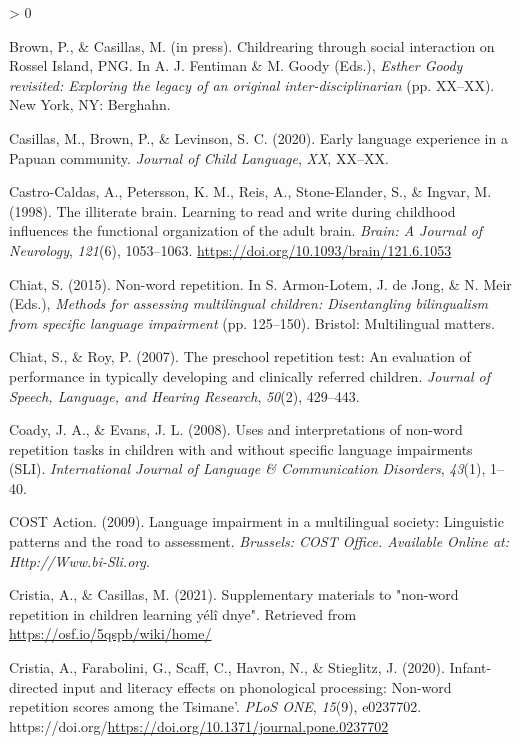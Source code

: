 \documentclass[
  english,
  ,man,floatsintext]{apa6}
\newlength{\cslhangindent}
\newenvironment{CSLReferences}[2] %
 {%
  \setlength{\parindent}{0pt}
  \ifodd #1 \everypar{\setlength{\hangindent}{\cslhangindent}}\ignorespaces\fi
  \ifnum #2 > 0
  \setlength{\parskip}{#2\baselineskip}
  \fi
 }%
 {}
\begin{document}
\begin{CSLReferences}{1}{0}
\leavevmode\hypertarget{ref-brownIPchildrearing}{}%
Brown, P., \& Casillas, M. (in press). Childrearing through social interaction on {Rossel Island, PNG}. In A. J. Fentiman \& M. Goody (Eds.), \emph{{Esther Goody} revisited: Exploring the legacy of an original inter-disciplinarian} (pp. XX--XX). New York, NY: Berghahn.

\leavevmode\hypertarget{ref-casillas2020early}{}%
Casillas, M., Brown, P., \& Levinson, S. C. (2020). {Early language experience in a Papuan community}. \emph{Journal of Child Language}, \emph{XX}, XX--XX.

\leavevmode\hypertarget{ref-castro1998illiterate}{}%
Castro-Caldas, A., Petersson, K. M., Reis, A., Stone-Elander, S., \& Ingvar, M. (1998). {The illiterate brain. Learning to read and write during childhood influences the functional organization of the adult brain.} \emph{Brain: A Journal of Neurology}, \emph{121}(6), 1053--1063. \url{https://doi.org/10.1093/brain/121.6.1053}

\leavevmode\hypertarget{ref-chiat2015nonword}{}%
Chiat, S. (2015). Non-word repetition. In S. Armon-Lotem, J. de Jong, \& N. Meir (Eds.), \emph{Methods for assessing multilingual children: Disentangling bilingualism from specific language impairment} (pp. 125--150). Bristol: Multilingual matters.

\leavevmode\hypertarget{ref-chiat2007preschool}{}%
Chiat, S., \& Roy, P. (2007). The preschool repetition test: An evaluation of performance in typically developing and clinically referred children. \emph{Journal of Speech, Language, and Hearing Research}, \emph{50}(2), 429--443.

\leavevmode\hypertarget{ref-coady2008uses}{}%
Coady, J. A., \& Evans, J. L. (2008). Uses and interpretations of non-word repetition tasks in children with and without specific language impairments (SLI). \emph{International Journal of Language \& Communication Disorders}, \emph{43}(1), 1--40.

\leavevmode\hypertarget{ref-is08042009language}{}%
COST Action. (2009). Language impairment in a multilingual society: Linguistic patterns and the road to assessment. \emph{Brussels: COST Office. Available Online at: Http://Www.bi-Sli.org}.

\leavevmode\hypertarget{ref-cristia2021supplementary}{}%
Cristia, A., \& Casillas, M. (2021). Supplementary materials to "non-word repetition in children learning yélî dnye". Retrieved from \url{https://osf.io/5qspb/wiki/home/}

\leavevmode\hypertarget{ref-cristia2020infant}{}%
Cristia, A., Farabolini, G., Scaff, C., Havron, N., \& Stieglitz, J. (2020). Infant-directed input and literacy effects on phonological processing: Non-word repetition scores among the {T}simane'. \emph{PLoS ONE}, \emph{15}(9), e0237702. https://doi.org/\url{https://doi.org/10.1371/journal.pone.0237702}


\end{CSLReferences}
\end{document}
